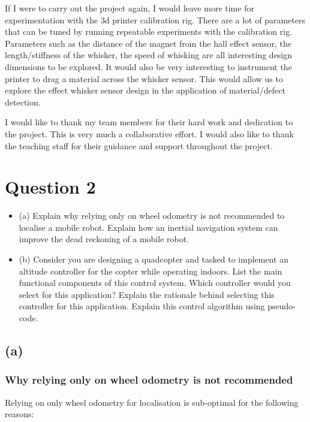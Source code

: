 \documentclass{report}
\begin{document}
If I were to carry out the project again, I would leave more time for experimentation with the 3d printer calibration rig. There are a lot of parameters that can be tuned by running repeatable experiments with the calibration rig. Parameters such as the distance of the magnet from the hall effect sensor, the length/stiffness of the whisker, the speed of whisking are all interesting design dimensions to be explored. It would also be very interesting to instrument the printer to drag a material across the whisker sensor. This would allow us to explore the effect whisker sensor design in the application of material/defect detection.

I would like to thank my team members for their hard work and dedication to the project. This is very much a collaborative effort. I would also like to thank the teaching staff for their guidance and support throughout the project.

\chapter{Question 2}

\begin{itemize}
    \item (a) Explain why relying only on wheel odometry is not recommended to localise a mobile robot. Explain how
    an inertial navigation system can improve the dead reckoning of a mobile robot.

    \item (b) Consider you are designing a quadcopter and tasked to implement an altitude controller for the copter while
    operating indoors. List the main functional components of this control system. Which controller would you
    select for this application? Explain the rationale behind selecting this controller for this application. Explain
this control algorithm using pseudo-code.
\end{itemize}

\section{(a)}

\subsection{Why relying only on wheel odometry is not recommended}

Relying on only wheel odometry for localisation is sub-optimal for the following reasons:
\end{document}
